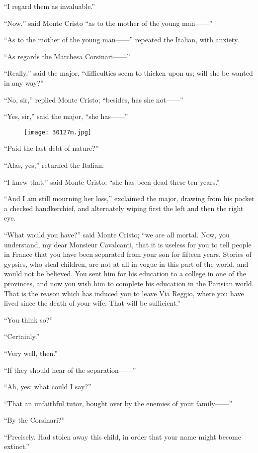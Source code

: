 “I regard them as invaluable.”

“Now,” said Monte Cristo “as to the mother of the young man——”

“As to the mother of the young man——” repeated the Italian, with
anxiety.

“As regards the Marchesa Corsinari——”

“Really,” said the major, “difficulties seem to thicken upon us; will
she be wanted in any way?”

“No, sir,” replied Monte Cristo; “besides, has she not——”

“Yes, sir,” said the major, “she has——”

\begin{figure}[ht]
\texttt{[image: 30127m.jpg]}
\end{figure}

“Paid the last debt of nature?”

“Alas, yes,” returned the Italian.

“I knew that,” said Monte Cristo; “she has been dead these ten years.”

“And I am still mourning her loss,” exclaimed the major, drawing from
his pocket a checked handkerchief, and alternately wiping first the
left and then the right eye.

“What would you have?” said Monte Cristo; “we are all mortal. Now, you
understand, my dear Monsieur Cavalcanti, that it is useless for you to
tell people in France that you have been separated from your son for
fifteen years. Stories of gypsies, who steal children, are not at all
in vogue in this part of the world, and would not be believed. You sent
him for his education to a college in one of the provinces, and now you
wish him to complete his education in the Parisian world. That is the
reason which has induced you to leave Via Reggio, where you have lived
since the death of your wife. That will be sufficient.”

“You think so?”

“Certainly.”

“Very well, then.”

“If they should hear of the separation——”

“Ah, yes; what could I say?”

“That an unfaithful tutor, bought over by the enemies of your family——”

“By the Corsinari?”

“Precisely. Had stolen away this child, in order that your name might
become extinct.”


